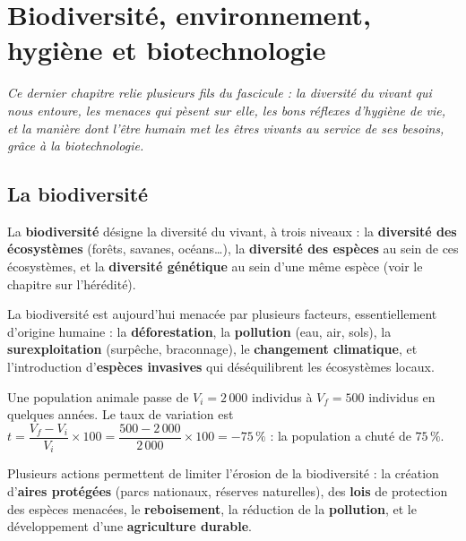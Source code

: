\chapter{Biodiversité, environnement, hygiène et biotechnologie}

\noindent\textit{Ce dernier chapitre relie plusieurs fils du fascicule : la diversité du
vivant qui nous entoure, les menaces qui pèsent sur elle, les bons réflexes d'hygiène de
vie, et la manière dont l'être humain met les êtres vivants au service de ses besoins,
grâce à la biotechnologie.}
\vspace{8pt}

\connecteBanner

\section{La biodiversité}

\begin{definition}[Biodiversité]
La \textbf{biodiversité} désigne la diversité du vivant, à trois niveaux : la
\textbf{diversité des écosystèmes} (forêts, savanes, océans\dots), la \textbf{diversité
des espèces} au sein de ces écosystèmes, et la \textbf{diversité génétique} au sein
d'une même espèce (voir le chapitre sur l'hérédité).
\end{definition}

\begin{propriete}
La biodiversité est aujourd'hui menacée par plusieurs facteurs, essentiellement
d'origine humaine : la \textbf{déforestation}, la \textbf{pollution} (eau, air, sols),
la \textbf{surexploitation} (surpêche, braconnage), le \textbf{changement climatique}, et
l'introduction d'\textbf{espèces invasives} qui déséquilibrent les écosystèmes locaux.
\end{propriete}

\begin{exemple}
Une population animale passe de $V_i=2\,000$ individus à $V_f=500$ individus en
quelques années. Le taux de variation est
$t=\dfrac{V_f-V_i}{V_i}\times100=\dfrac{500-2\,000}{2\,000}\times100=-75\,\%$ : la
population a chuté de $75\,\%$.
\end{exemple}

\begin{propriete}
Plusieurs actions permettent de limiter l'érosion de la biodiversité : la création
d'\textbf{aires protégées} (parcs nationaux, réserves naturelles), des \textbf{lois} de
protection des espèces menacées, le \textbf{reboisement}, la réduction de la
\textbf{pollution}, et le développement d'une \textbf{agriculture durable}.
\end{propriete}

